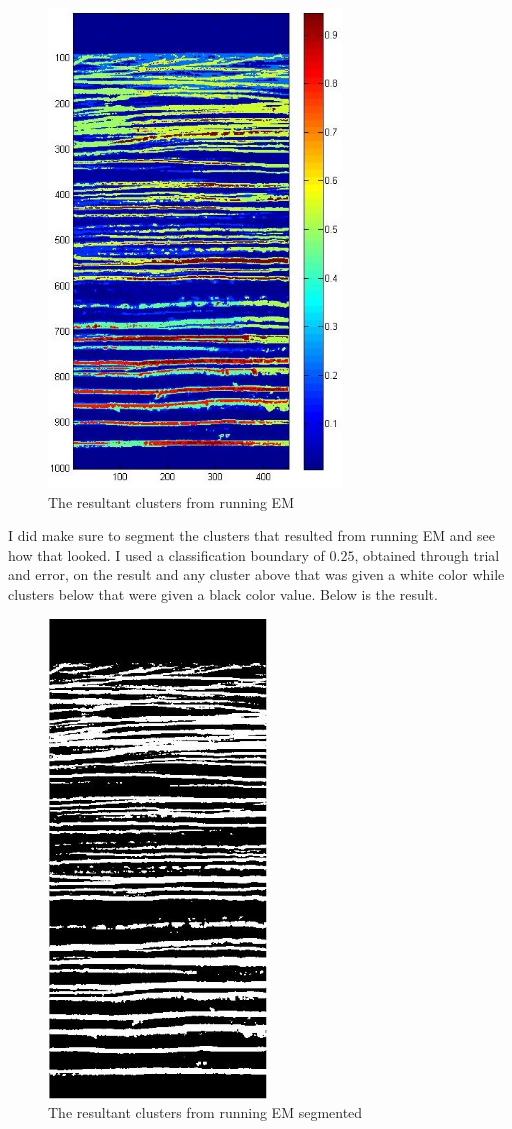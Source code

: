 \documentclass[11pt,psfig]{article}
\begin{document}
\begin{figure}[H]
\centering
\includegraphics[height=5in]{emResultUnsegmented.jpg}
\caption{The resultant clusters from running EM}
\end{figure}
I did make sure to segment the clusters that resulted from running EM and see how that looked. I used a classification boundary of $0.25$, obtained through trial and error, on the result and any cluster above that was given a white color while clusters below that were given a black color value. Below is the result.
\begin{figure}[H]
\centering
\includegraphics[height=5in]{emResultSegmented.jpg}
\caption{The resultant clusters from running EM segmented}
\end{figure}
\end{document}
